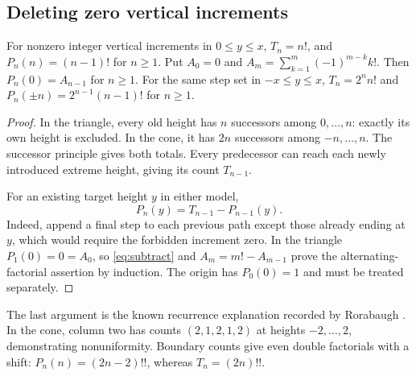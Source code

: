 \subsection{Deleting zero vertical increments}
\begin{proposition}\label{prop:delete}
For nonzero integer vertical increments in $0\le y\le x$, $T_n=n!$, and $P_n(n)=(n-1)!$ for $n\ge1$. Put $A_0=0$ and $A_m=\sum_{k=1}^m(-1)^{m-k}k!$. Then $P_n(0)=A_{n-1}$ for $n\ge1$.
For the same step set in $-x\le y\le x$, $T_n=2^n n!$ and $P_n(\pm n)=2^{n-1}(n-1)!$ for $n\ge1$.
\end{proposition}
\begin{proof}
In the triangle, every old height has $n$ successors among $0,\ldots,n$: exactly its own height is excluded. In the cone, it has $2n$ successors among $-n,\ldots,n$. The successor principle gives both totals. Every predecessor can reach each newly introduced extreme height, giving its count $T_{n-1}$.

For an existing target height $y$ in either model,
\begin{equation}\label{eq:subtract}
P_n(y)=T_{n-1}-P_{n-1}(y).
\end{equation}
Indeed, append a final step to each previous path except those already ending at $y$, which would require the forbidden increment zero. In the triangle $P_1(0)=0=A_0$, so \eqref{eq:subtract} and $A_m=m!-A_{m-1}$ prove the alternating-factorial assertion by induction. The origin has $P_0(0)=1$ and must be treated separately.
\end{proof}
The last argument is the known recurrence explanation recorded by Rorabaugh \cite{Rorabaugh}. In the cone, column two has counts $(2,1,2,1,2)$ at heights $-2,\ldots,2$, demonstrating nonuniformity. Boundary counts give even double factorials with a shift: $P_n(n)=(2n-2)!!$, whereas $T_n=(2n)!!$.

